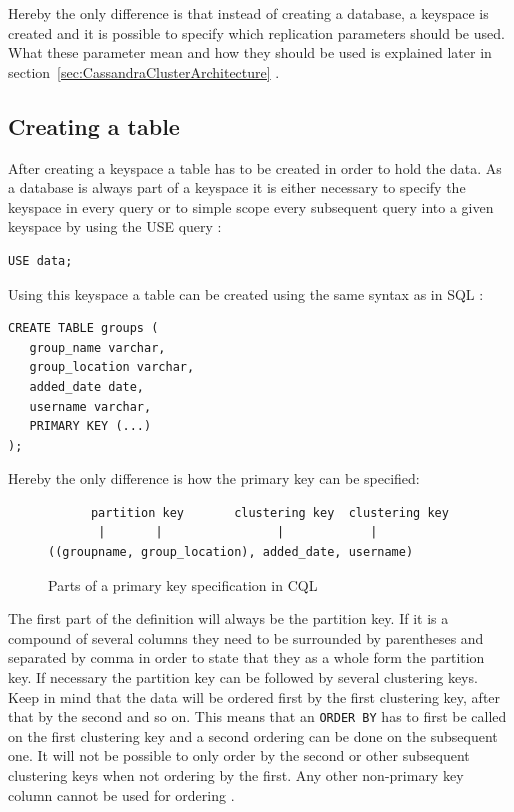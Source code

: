 Hereby the only difference is that instead of creating a database, a keyspace is created and it is possible to specify which replication parameters should be used. What these parameter mean and how they should be used is explained later in section~\ref{sec:CassandraClusterArchitecture} \autocite{cqlAlexMeng}.

\subsection{Creating a table}
After creating a keyspace a table has to be created in order to hold the data. As a database is always part of a keyspace it is either necessary to specify the keyspace in every query or to simple scope every subsequent query into a given keyspace by using the USE query \autocite{cassandra3cqldocUse}:
\begin{verbatim}
USE data;
\end{verbatim}

Using this keyspace a table can be created using the same syntax as in SQL \autocite{cqlAlexMeng, newInCQL3, cassandra3cqldocCreateTable}:
\begin{verbatim}
CREATE TABLE groups (
   group_name varchar,
   group_location varchar,
   added_date date,
   username varchar,
   PRIMARY KEY (...)
);
\end{verbatim}

Hereby the only difference is how the primary key can be specified:

\begin{figure}[ht]
    \centering
\begin{verbatim}
      partition key       clustering key  clustering key
       |       |                |            |
((groupname, group_location), added_date, username)
\end{verbatim}
    \caption{Parts of a primary key specification in CQL \autocite{cqlPrimaryKeyDefinition}}
    \label{fig:cassandra:primaryKeyDefinition}
\end{figure}

The first part of the definition will always be the partition key. If it is a compound of several columns they need to be surrounded by parentheses and separated by comma in order to state that they as a whole form the partition key. If necessary the partition key can be followed by several clustering keys. Keep in mind that the data will be ordered first by the first clustering key, after that by the second and so on. This means that an \texttt{ORDER BY} has to first be called on the first clustering key and a second ordering can be done on the subsequent one. It will not be possible to only order by the second or other subsequent clustering keys when not ordering by the first. Any other non-primary key column cannot be used for ordering \autocite{cqlPrimaryKeyDefinition, cassandra3cqldocCreateTable}.

